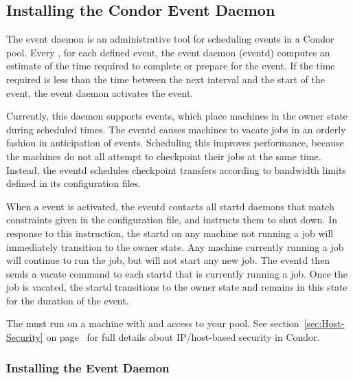 \subsection{\label{sec:EventD}
Installing the Condor Event Daemon}


The event daemon is an administrative tool for scheduling events in a
Condor pool.
Every , for each defined event, the event
daemon (eventd) computes an estimate of the time required to complete or
prepare for the event.  If the time required is less than the time
between the next interval and the start of the event, the event daemon
activates the event.

Currently, this daemon supports  events, which place machines
in the owner state during scheduled times.
The eventd causes machines to vacate jobs in an orderly fashion
in anticipation of  events.
Scheduling this improves performance, because the machines
do not all attempt to checkpoint their jobs at the same time.
Instead, the eventd schedules checkpoint transfers according to
bandwidth limits defined in its configuration files.

When a  event is activated, the eventd contacts all startd
daemons
that match constraints given in the configuration file,
and instructs them to shut down.
In response to this instruction,
the startd on any machine not running a job will immediately transition to
the owner state.
Any machine currently running a job will continue to run the
job, but will not start any new job.
The eventd then sends a vacate command to each startd
that is currently running a job.
Once the job is vacated, the startd transitions to the
owner state and remains in this state for the duration of the
 event.

The  must run on a machine with 
 and  access to your pool.
See section~\ref{sec:Host-Security} on
page~\pageref{sec:Host-Security} for full details about IP/host-based
security in Condor.

\subsubsection{\label{sec:EventD-Installation}
Installing the Event Daemon} 

